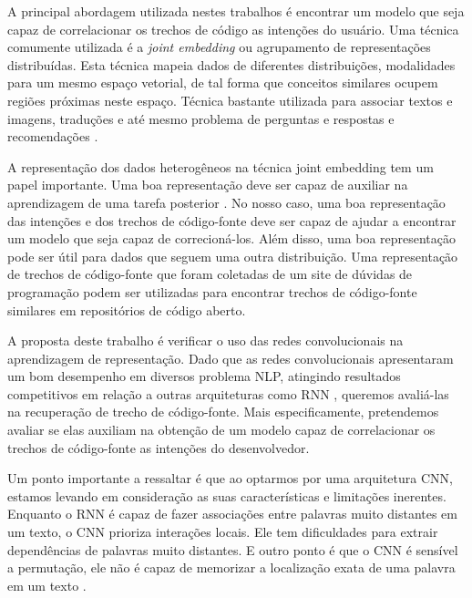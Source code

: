 A principal abordagem utilizada nestes trabalhos é encontrar um \gls{modelo} que seja capaz de correlacionar os trechos de código as intenções do usuário. Uma técnica comumente utilizada é a \textit{joint embedding} ou agrupamento de representações distribuídas. Esta técnica mapeia dados de diferentes distribuições, modalidades para um mesmo espaço vetorial, de tal forma que conceitos similares ocupem regiões próximas neste espaço. Técnica bastante utilizada para associar textos e imagens, traduções e até mesmo problema de perguntas e respostas e recomendações \citep{lai-etal-2018-review, Zhang:2019:deep-learning-recommender-survey}.

A representação dos dados heterogêneos na técnica joint embedding tem um papel importante. Uma boa representação deve ser capaz de auxiliar na aprendizagem de uma tarefa
posterior \citep{Goodfellow-et-al-2016:representation-learning}. No nosso caso, uma boa representação das intenções e dos trechos de código-fonte deve ser capaz de ajudar a encontrar um modelo que seja capaz de correcioná-los. Além disso, uma boa representação pode ser útil para dados que seguem uma outra distribuição. Uma representação de trechos de código-fonte que foram coletadas de um site de dúvidas de programação podem ser utilizadas para encontrar trechos de código-fonte similares em repositórios de código aberto.

A proposta deste trabalho é verificar o uso das redes convolucionais na aprendizagem de representação. Dado que as redes convolucionais apresentaram um bom desempenho em diversos problema NLP, atingindo resultados competitivos em relação a outras arquiteturas como RNN \citep{tom-young:trends-deep-learning-nlp}, queremos avaliá-las na recuperação de trecho de código-fonte. Mais especificamente, pretendemos avaliar se elas auxiliam na obtenção de um modelo capaz de correlacionar os trechos de código-fonte as intenções do desenvolvedor. 

Um ponto importante a ressaltar é que ao optarmos por uma arquitetura CNN, estamos levando em consideração as suas características e limitações inerentes. Enquanto o RNN é capaz de fazer associações entre palavras muito distantes em um texto, o CNN prioriza interações locais. Ele tem dificuldades para extrair dependências de palavras muito distantes. E outro ponto é que o CNN é sensível a permutação, ele não é capaz de memorizar a localização exata de uma palavra em um texto \citep{Goodfellow-et-al-2016:convolutional-networks, tom-young:trends-deep-learning-nlp}.

